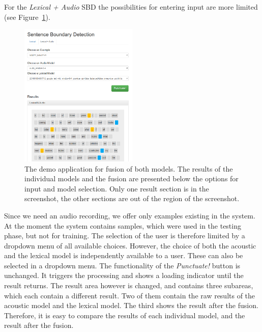 For the \emph{Lexical + Audio} SBD the possibilities for entering input are more limited (see Figure~\ref{fig:demo_la}).
\begin{figure}[ht]
    \centering
    \includegraphics[width=0.5\textwidth]{img/demo_l_a.png}
    \caption{The demo application for fusion of both models. The results of the individual models and the fusion are presented below the options for input and model selection. Only one result section is in the screenshot, the other sections are out of the region of the screenshot.}
    \label{fig:demo_la}
\end{figure}
Since we need an audio recording, we offer only examples existing in the system.
At the moment the system contains samples, which were used in the testing phase, but not for training.
The selection of the user is therefore limited by a dropdown menu of all available choices.
However, the choice of both the acoustic and the lexical model is independently available to a user.
These can also be selected in a dropdown menu.
The functionality of the \emph{Punctuate!} button is unchanged.
It triggers the processing and shows a loading indicator until the result returns.
The result area however is changed, and contains three subareas, which each contain a different result.
Two of them contain the raw results of the acoustic model and the lexical model.
The third shows the result after the fusion.
Therefore, it is easy to compare the results of each individual model, and the result after the fusion.
